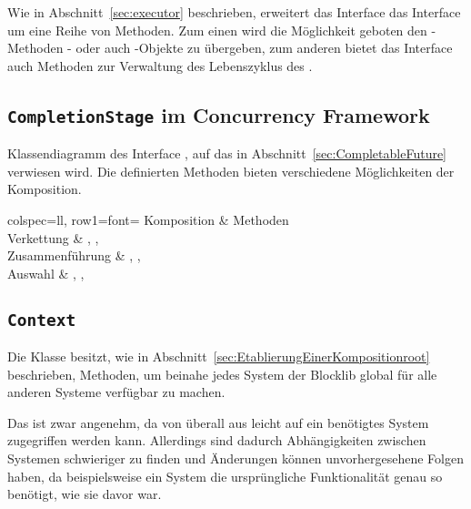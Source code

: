 Wie in Abschnitt~\vref{sec:executor} beschrieben, erweitert das Interface  das Interface  um eine Reihe von Methoden. Zum einen wird die Möglichkeit geboten den -Methoden - oder auch -Objekte zu übergeben, zum anderen bietet das Interface auch Methoden zur Verwaltung des Lebenszyklus des .

\clearpage
\subsection{\texttt{CompletionStage} im Concurrency Framework}\label{appendix:CompletionStage}


Klassendiagramm des Interface , auf das in Abschnitt~\vref{sec:CompletableFuture} verwiesen wird. Die definierten Methoden bieten verschiedene Möglichkeiten der Komposition.

\begin{tblr}{
	colspec={ll},
	row{1}={font=\bfseries}
	}
	Komposition & Methoden \\
	Verkettung & , , \\
	Zusammenführung & , ,  \\
	Auswahl & , ,  \\
\end{tblr}

\clearpage
\subsection{\texttt{Context}}\label{appendix:context}
{
	\centering
	
	\par
}
Die Klasse  besitzt, wie in Abschnitt~\vref{sec:EtablierungEinerKompositionroot} beschrieben, Methoden, um beinahe jedes System der Blocklib global für alle anderen Systeme verfügbar zu machen. 

Das ist zwar angenehm, da von überall aus leicht auf ein benötigtes System zugegriffen werden kann. Allerdings sind dadurch Abhängigkeiten zwischen Systemen schwieriger zu finden und Änderungen können unvorhergesehene Folgen haben, da beispielsweise ein System die ursprüngliche Funktionalität genau so benötigt, wie sie davor war. 

